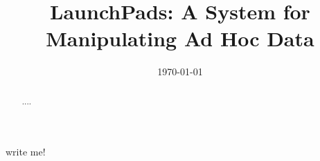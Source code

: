 \documentclass[nocopyrightspace]{sigplanconf}
\title{LaunchPads: A System for Manipulating Ad Hoc Data}
\date{\today}
\begin{document}
\maketitle
\begin{abstract}
....
\end{abstract}

write me! \cite{padsmanual}


\small
 
\end{document}

